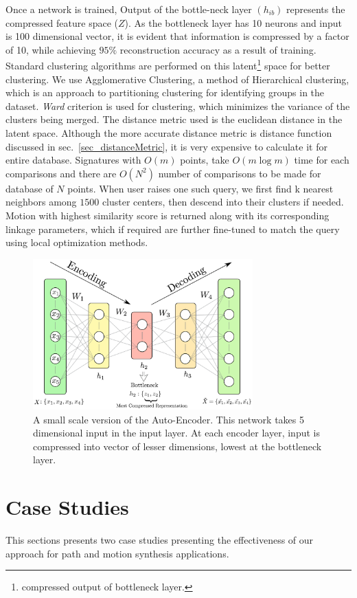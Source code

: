 \documentclass[twocolumn,10pt]{asme2e}
\begin{document}
Once a network is trained, Output of the bottle-neck layer $(h_{ib})$ represents the compressed feature space ($Z$).
As the bottleneck layer has 10 neurons and input is 100 dimensional vector, it is evident that information is compressed by a factor of 10, while achieving $95\%$ reconstruction accuracy as a result of training.
Standard clustering algorithms are performed on this latent\footnote{compressed output of bottleneck layer.} space for better clustering\cite{song2013}.
We use Agglomerative Clustering, a method of Hierarchical clustering, which is an approach to partitioning clustering for identifying groups in the dataset.
\emph{Ward}\cite{ward1963} criterion is used for clustering, which minimizes the variance of the clusters being merged.
The distance metric used is the euclidean distance in the latent space.
Although the more accurate distance metric is distance function discussed in sec.~\ref{sec_distanceMetric}, it is very expensive to calculate it for entire database.
Signatures with ${O}(m)$ points, take ${O}(m\log{}m)$ time for each comparisons and there are ${O}(N^2)$ number of comparisons to be made for database of $N$ points.
When user raises one such query, we first find k nearest neighbors among $1500$ cluster centers, then descend into their clusters if needed.
Motion with highest similarity score is returned along with its corresponding linkage parameters, which if required are further fine-tuned to match the query using local optimization methods.

\begin{figure}
\centering
\includegraphics[width=240pt]{figure/fig_auto_encoder.eps}
  \caption{A small scale version of the Auto-Encoder. This network takes 5 dimensional input in the input layer. At each encoder layer, input is compressed into vector of lesser dimensions, lowest at the bottleneck layer.}
\label{autoEncoder}
\end{figure}


\section{Case Studies}\label{sec_example}
This sections presents two case studies presenting the effectiveness of our approach for path and motion synthesis applications.
\end{document}
